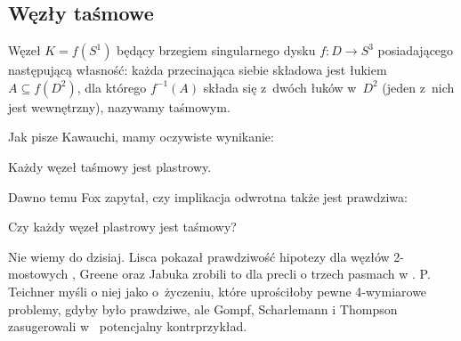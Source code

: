 \subsection{Węzły taśmowe}
\begin{definition}
    Węzeł $K = f(S^1)$ będący brzegiem singularnego dysku $f \colon D \to S^3$ posiadającego następującą własność: każda przecinająca siebie składowa jest łukiem $A \subseteq f(D^2)$, dla którego $f^{-1}(A)$ składa się z~dwóch łuków w~$D^2$ (jeden z~nich jest wewnętrzny), nazywamy taśmowym.
\end{definition}

Jak pisze Kawauchi, mamy oczywiste wynikanie:

\begin{proposition}
    Każdy węzeł taśmowy jest plastrowy.
\end{proposition}

Dawno temu Fox zapytał, czy implikacja odwrotna także jest prawdziwa:

\begin{conjecture}
    Czy każdy węzeł plastrowy jest taśmowy?
\end{conjecture}

Nie wiemy do dzisiaj.
Lisca pokazał prawdziwość hipotezy dla węzłów 2-mostowych \cite{lisca07}, Greene oraz Jabuka zrobili to dla precli o trzech pasmach w \cite{greene11}.
%
%
P. Teichner myśli o niej jako o~życzeniu, które uprościłoby pewne 4-wymiarowe problemy, gdyby było prawdziwe, ale Gompf, Scharlemann i Thompson zasugerowali w~\cite{gompf10} potencjalny kontrprzykład.
